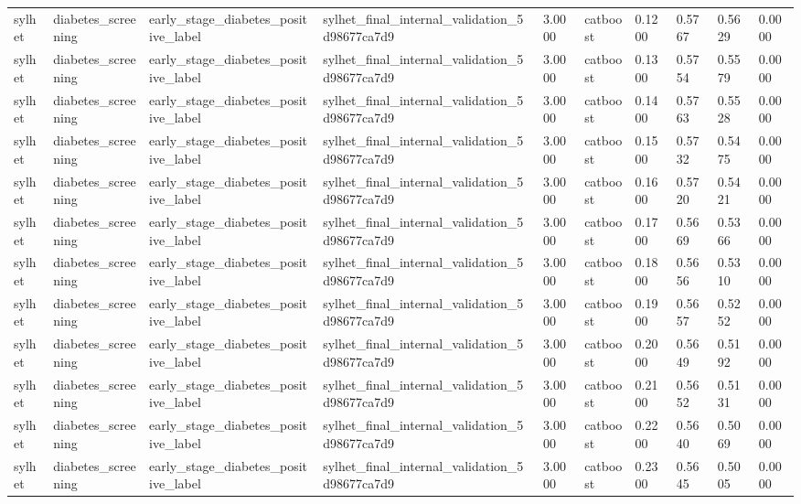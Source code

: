 \begin{tabular}{llllllllll}
sylhet & diabetes\_screening & early\_stage\_diabetes\_positive\_label & sylhet\_final\_internal\_validation\_5d98677ca7d9 & 3.0000 & catboost & 0.1200 & 0.5767 & 0.5629 & 0.0000 \\
sylhet & diabetes\_screening & early\_stage\_diabetes\_positive\_label & sylhet\_final\_internal\_validation\_5d98677ca7d9 & 3.0000 & catboost & 0.1300 & 0.5754 & 0.5579 & 0.0000 \\
sylhet & diabetes\_screening & early\_stage\_diabetes\_positive\_label & sylhet\_final\_internal\_validation\_5d98677ca7d9 & 3.0000 & catboost & 0.1400 & 0.5763 & 0.5528 & 0.0000 \\
sylhet & diabetes\_screening & early\_stage\_diabetes\_positive\_label & sylhet\_final\_internal\_validation\_5d98677ca7d9 & 3.0000 & catboost & 0.1500 & 0.5732 & 0.5475 & 0.0000 \\
sylhet & diabetes\_screening & early\_stage\_diabetes\_positive\_label & sylhet\_final\_internal\_validation\_5d98677ca7d9 & 3.0000 & catboost & 0.1600 & 0.5720 & 0.5421 & 0.0000 \\
sylhet & diabetes\_screening & early\_stage\_diabetes\_positive\_label & sylhet\_final\_internal\_validation\_5d98677ca7d9 & 3.0000 & catboost & 0.1700 & 0.5669 & 0.5366 & 0.0000 \\
sylhet & diabetes\_screening & early\_stage\_diabetes\_positive\_label & sylhet\_final\_internal\_validation\_5d98677ca7d9 & 3.0000 & catboost & 0.1800 & 0.5656 & 0.5310 & 0.0000 \\
sylhet & diabetes\_screening & early\_stage\_diabetes\_positive\_label & sylhet\_final\_internal\_validation\_5d98677ca7d9 & 3.0000 & catboost & 0.1900 & 0.5657 & 0.5252 & 0.0000 \\
sylhet & diabetes\_screening & early\_stage\_diabetes\_positive\_label & sylhet\_final\_internal\_validation\_5d98677ca7d9 & 3.0000 & catboost & 0.2000 & 0.5649 & 0.5192 & 0.0000 \\
sylhet & diabetes\_screening & early\_stage\_diabetes\_positive\_label & sylhet\_final\_internal\_validation\_5d98677ca7d9 & 3.0000 & catboost & 0.2100 & 0.5652 & 0.5131 & 0.0000 \\
sylhet & diabetes\_screening & early\_stage\_diabetes\_positive\_label & sylhet\_final\_internal\_validation\_5d98677ca7d9 & 3.0000 & catboost & 0.2200 & 0.5640 & 0.5069 & 0.0000 \\
sylhet & diabetes\_screening & early\_stage\_diabetes\_positive\_label & sylhet\_final\_internal\_validation\_5d98677ca7d9 & 3.0000 & catboost & 0.2300 & 0.5645 & 0.5005 & 0.0000 \\

\end{tabular}
